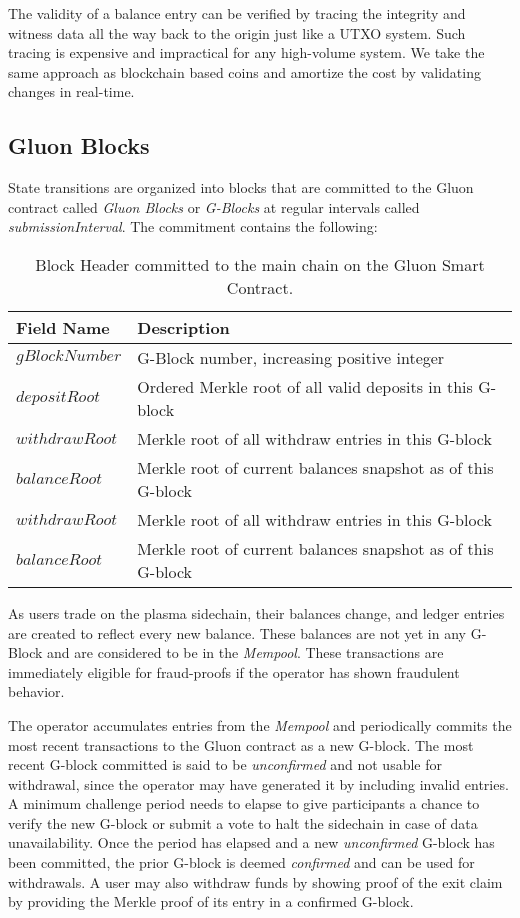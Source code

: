 \documentclass[12pt,a4paper]{article}
\begin{document}
The validity of a balance entry can be verified by tracing the integrity and witness data all the way back to the origin just like a UTXO system. Such tracing is expensive and impractical for any high-volume system. We take the same approach as blockchain based coins and amortize the cost by validating changes in real-time.

\subsection{Gluon Blocks}
State transitions are organized into blocks that are committed to the Gluon contract called \emph{Gluon Blocks} or \emph{G-Blocks} at regular intervals called \emph{submissionInterval}. The commitment contains the following:

\begin{table}[ht]
\caption{Block Header committed to the main chain on the Gluon Smart Contract.}
\centering
\begin{tabular}{|l|l|}
\hline
\bfseries Field Name &\bfseries  Description \\
\hline
$gBlockNumber$ & G-Block number, increasing positive integer \\ 
$depositRoot$ & Ordered Merkle root of all valid deposits in this G-block \\ 
$withdrawRoot$ & Merkle root of all withdraw entries in this G-block \\ 
$balanceRoot$ & Merkle root of current balances snapshot as of this G-block\\ 
$withdrawRoot$ & Merkle root of all withdraw entries in this G-block \\
$balanceRoot$ & Merkle root of current balances snapshot as of this G-block\\

\hline
\end{tabular}
\end{table}

As users trade on the plasma sidechain, their balances change, and ledger entries are created to reflect every new balance. These balances are not yet in any G-Block and are considered to be in the \emph{Mempool}. These transactions are immediately eligible for fraud-proofs if the operator has shown fraudulent behavior.

The operator accumulates entries from the \emph{Mempool} and periodically commits the most recent transactions to the Gluon contract as a new G-block. The most recent G-block committed is said to be \emph{unconfirmed} and not usable for withdrawal, since the operator may have generated it by including invalid entries. A minimum challenge period needs to elapse to give participants a chance to verify the new G-block or submit a vote to halt the sidechain in case of data unavailability. Once the period has elapsed and a new \emph{unconfirmed} G-block has been committed, the prior G-block is deemed \emph{confirmed} and can be used for withdrawals. A user may also withdraw funds by showing proof of the exit claim by providing the Merkle proof of its entry in a confirmed G-block.
\end{document}

